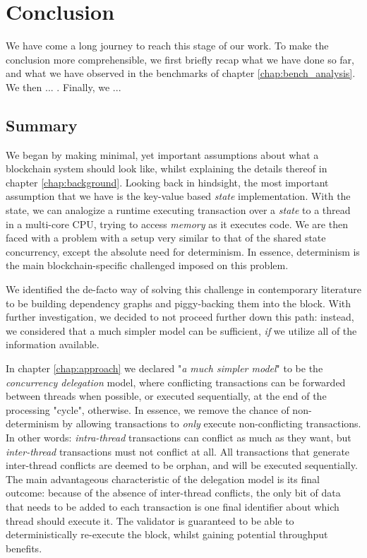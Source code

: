 \chapter{Conclusion} \label{chap:conclusion}

We have come a long journey to reach this stage of our work. To make the conclusion more
comprehensible, we first briefly recap what we have done so far, and what we have observed in the
benchmarks of chapter \ref{chap:bench_analysis}. We then ... . Finally, we ... 

\section{Summary}
We began by making minimal, yet important assumptions about what a blockchain system should look
like, whilst explaining the details thereof in chapter \ref{chap:background}. Looking back in
hindsight, the most important assumption that we have is the key-value based \textit{state}
implementation. With the state, we can analogize a runtime executing transaction over a
\textit{state} to a thread in a multi-core CPU, trying to access \textit{memory} as it executes
code. We are then faced with a problem with a setup very similar to that of the shared state
concurrency, except the absolute need for determinism. In essence, determinism is the main
blockchain-specific challenged imposed on this problem.

We identified the de-facto way of solving this challenge in contemporary literature to be building
dependency graphs and piggy-backing them into the block. With further investigation, we decided to
not proceed further down this path: instead, we considered that a much simpler model can be
sufficient, \textit{if} we utilize all of the information available.

In chapter \ref{chap:approach} we declared "\textit{a much simpler model}" to be the
\textit{concurrency delegation} model, where conflicting transactions can be forwarded between
threads when possible, or executed sequentially, at the end of the processing "cycle", otherwise. In essence, we remove the
chance of non-determinism by allowing transactions to \textit{only} execute non-conflicting
transactions. In other words: \textit{intra-thread} transactions can conflict as much as they want, but \textit{inter-thread} transactions must not conflict at all. All transactions that generate inter-thread conflicts are
deemed to be orphan, and will be executed sequentially. The main advantageous characteristic of the
delegation model is its final outcome: because of the absence of inter-thread conflicts, the only bit of
data that needs to be added to each transaction is one final identifier about which thread should
execute it. The validator is guaranteed to be able to deterministically re-execute the block,
whilst gaining potential throughput benefits.

